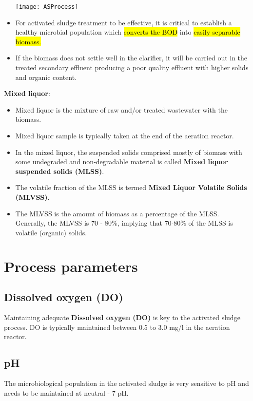 \begin{itemize}
\begin{center}
\texttt{[image: ASProcess]}
\end{center}

\item For activated sludge treatment to be effective, it is critical to establish a healthy microbial population which \hl{converts the BOD} into \hl{easily separable biomass.}
\item If the biomass does not settle well in the clarifier, it will be carried out in the treated secondary effluent producing a poor quality effluent with higher solids and organic content.  \\
\end{itemize}

    \begin{mdframed}[backgroundcolor=blue!20] 
\textbf{Mixed liquor}:
\begin{itemize}
\item Mixed liquor is the mixture of raw and/or treated wastewater with the biomass.
\item Mixed liquor sample is typically taken at the end of the aeration reactor.
\item In the mixed liquor, the suspended solids comprised mostly of biomass with some undegraded and non-degradable material is called \textbf{Mixed liquor suspended solids (MLSS)}.  
\item The volatile fraction of the MLSS is termed \textbf{Mixed Liquor Volatile Solids (MLVSS)}.  \item The MLVSS is the amount of biomass as a percentage of the MLSS.  Generally, the MLVSS is 70 - 80\%, implying that 70-80\% of the MLSS is volatile (organic) solids.
\end{itemize}
    \end{mdframed}


		\section{Process parameters}
\subsection{Dissolved oxygen (DO)}%
Maintaining adequate \textbf{Dissolved oxygen (DO)} is key to the activated sludge process.  DO is typically maintained between 0.5 to 3.0 mg/l in the aeration reactor.\\
\subsection{pH}%
The microbiological population in the activated sludge is very sensitive to pH and needs to be maintained at neutral - 7 pH.
